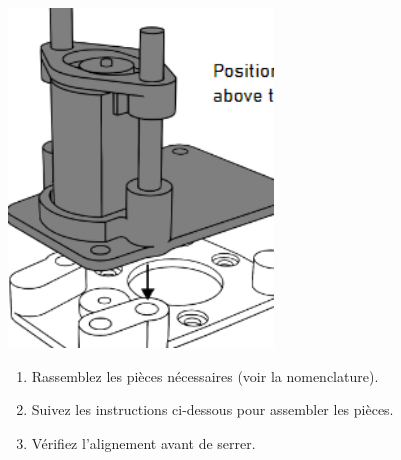 \begin{center}
    \includegraphics[height=9cm]{../images/step2_render.png}
\end{center}

\vspace{0.7em}

\begin{tcolorbox}[colback=gray!05, colframe=gray!60, boxrule=0.5pt, left=2mm, right=2mm, title=]
    \begin{enumerate}
        \item Rassemblez les pièces nécessaires (voir la nomenclature).
        \item Suivez les instructions ci-dessous pour assembler les pièces.
        \item Vérifiez l’alignement avant de serrer.
    \end{enumerate}
\end{tcolorbox}
